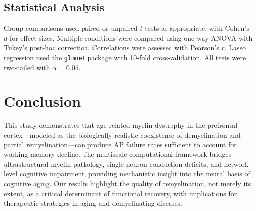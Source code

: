 \documentclass[11pt]{article}
\begin{document}
\subsection{Statistical Analysis}

Group comparisons used paired or unpaired $t$-tests as appropriate, with Cohen's $d$ for effect sizes. Multiple conditions were compared using one-way ANOVA with Tukey's post-hoc correction. Correlations were assessed with Pearson's $r$. Lasso regression used the \texttt{glmnet} package with 10-fold cross-validation. All tests were two-tailed with $\alpha = 0.05$.

\section{Conclusion}

This study demonstrates that age-related myelin dystrophy in the prefrontal cortex---modeled as the biologically realistic coexistence of demyelination and partial remyelination---can produce AP failure rates sufficient to account for working memory decline. The multiscale computational framework bridges ultrastructural myelin pathology, single-neuron conduction deficits, and network-level cognitive impairment, providing mechanistic insight into the neural basis of cognitive aging. Our results highlight the quality of remyelination, not merely its extent, as a critical determinant of functional recovery, with implications for therapeutic strategies in aging and demyelinating diseases.



\end{document}
